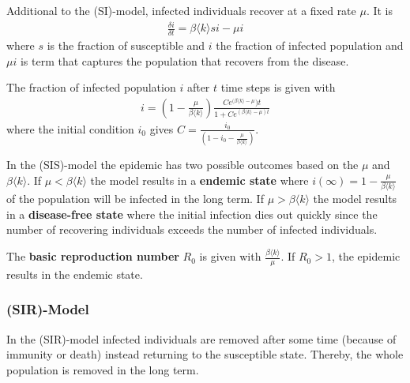 \documentclass[english]{panikzettel}
\begin{document}
Additional to the (SI)-model, infected individuals recover at a fixed rate $ \mu $. It is
\begin{align*}
	\frac{\delta i}{\delta t} = \beta \langle k \rangle si - \mu i
\end{align*}
where $ s $ is the fraction of susceptible and $ i $ the fraction of infected population and $ \mu i $ is term that captures the population that recovers from the disease.

The fraction of infected population $ i $ after $ t $ time steps is given with
\begin{align*}
	i = \left(1 - \frac{\mu}{\beta \langle k \rangle}\right) \frac{C e^{(\beta \langle k \rangle - \mu}) t}{1 + C e^{(\beta \langle k \rangle - \mu) t}}
\end{align*}
where the initial condition $ i_0 $ gives $ C = \frac{i_0}{(1 - i_0 - \frac{\mu}{\beta \langle k \rangle})} $.

In the (SIS)-model the epidemic has two possible outcomes based on the $ \mu $ and $ \beta \langle k \rangle $.
If $ \mu < \beta \langle k \rangle $ the model results in a \textbf{endemic state} where $ i(\infty) = 1 - \frac{\mu}{\beta \langle k \rangle} $ of the population will be infected in the long term. 
If $ \mu > \beta \langle k \rangle $ the model results in a \textbf{disease-free state} where the initial infection dies out quickly since the number of recovering individuals exceeds the number of infected individuals.

The \textbf{basic reproduction number} $ R_0 $ is given with $ \frac{\beta \langle k \rangle}{\mu} $.
If $ R_0 > 1 $, the epidemic results in the endemic state.

\subsubsection{(SIR)-Model}
In the (SIR)-model infected individuals are removed after some time (because of immunity or death) instead returning to the susceptible state.	
Thereby, the whole population is removed in the long term.

\begin{figure}[ht!]
	\centering
\end{figure}
\end{document}
